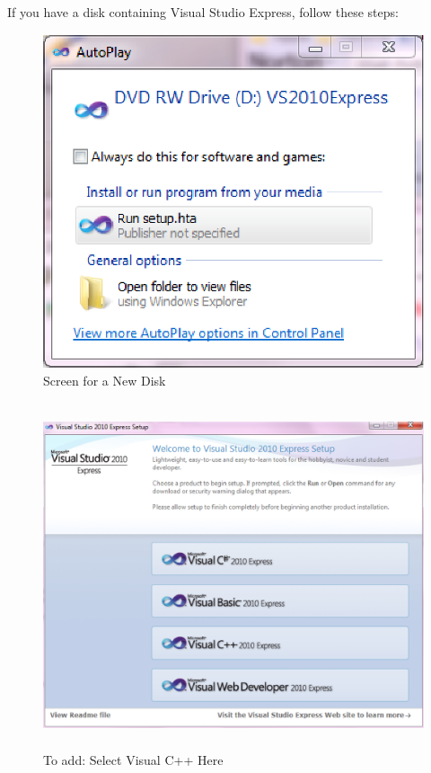 \documentclass[letterpaper,10pt]{article}%
\begin{document}
If you have a disk containing Visual Studio Express, follow these steps:

\begin{figure}
\centering
\includegraphics{DiskStart.eps}
\caption{Screen for a New Disk}
\label{fig:DiskStart}
\end{figure}

\begin{figure}
	\centering
		\includegraphics[height=4in,width=6in,keepaspectratio]{VisualCpp.eps}
	\caption{To add: Select Visual C++ Here}
	\label{fig:VisualCpp}
\end{figure}
\end{document}
